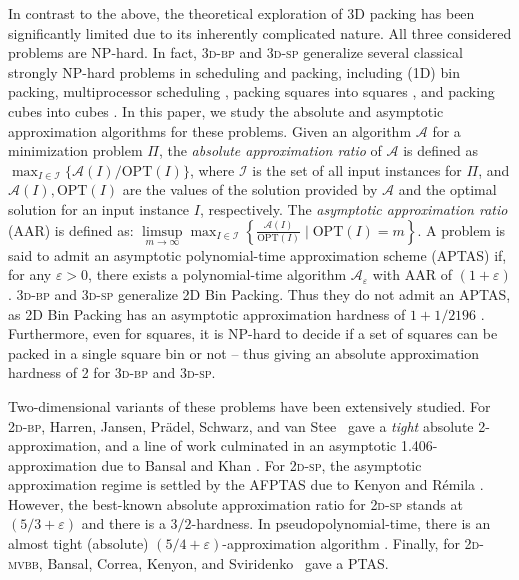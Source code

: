 \documentclass[a4paper,UKenglish,cleveref, autoref, thm-restate]{lipics-v2021}
\newcommand{\eps}{\varepsilon}
\newcommand{\opt}{\mathrm{OPT}}
\newcommand{\tbp}{\textsc{3d-bp}\xspace}
\newcommand{\tsp}{\textsc{3d-sp}\xspace}
\begin{document}
In contrast to the above, the theoretical exploration of 3D packing has been significantly limited due to its inherently complicated nature. 
All three considered problems are NP-hard. In fact, \tbp and \tsp generalize several classical strongly NP-hard problems in scheduling and packing, including (1D) bin packing, multiprocessor scheduling \cite{li-cheng}, packing squares into squares \cite{ferreira1999packing}, and packing cubes into cubes \cite{lu2015packing}. 
In this paper, we study the absolute and asymptotic approximation algorithms for these problems. Given an algorithm $\mathcal{A}$ for a minimization problem $\Pi$, the {\em absolute approximation ratio} of $\mathcal{A}$ is defined as $\max_{I \in \mathcal{I}} \{\mathcal{A}(I)/\opt(I)\}$, where 
$\mathcal{I}$ is the set of all input instances for $\Pi$, and $\mathcal{A}(I), \opt(I)$ are the values of the solution provided by  $\mathcal{A}$ and the optimal solution for an  input instance $I$, respectively.
The {\em asymptotic approximation ratio} (AAR) is defined as: 
$\limsup\limits_{m\rightarrow \infty} \max_{I \in \mathcal{I}} \left\{\frac{\mathcal{A}(I)}{\opt(I)} \mid \opt(I)=m \right\}.$
A problem is said to admit an asymptotic polynomial-time approximation scheme (APTAS) if, for any $\eps>0$, there exists a polynomial-time algorithm $\mathcal{A}_\eps$ with AAR of $(1+\eps)$.
\tbp and \tsp generalize 2D Bin Packing. Thus they do not admit an APTAS, as 2D Bin Packing has an asymptotic approximation hardness of $1+1/2196$ \cite{chlebik2009hardness}. 
Furthermore, even for squares, it is NP-hard to decide if a set of squares can be packed in a single square bin or not \cite{ferreira1999packing} -- thus giving an absolute approximation hardness of 2 for \tbp and \tsp.

Two-dimensional variants of these problems have been extensively studied. For \textsc{2d-bp}, Harren, Jansen, Pr{\"a}del, Schwarz, and van Stee~\cite{harren2013two} gave a {\em tight} absolute 2-approximation, and a line of work \cite{caprara2008packing,bansal2010new,jansen2016new} culminated in an asymptotic 1.406-approximation due to Bansal and Khan \cite{bansal2014improved}. 
For \textsc{2d-sp}, the asymptotic approximation regime is settled by the AFPTAS due to Kenyon and R{\'{e}}mila \cite{kenyon2000near}.
However, the best-known absolute approximation ratio for \textsc{2d-sp}  stands at $(5/3+\eps)$ \cite{harren20145} and there is a $3/2$-hardness. In pseudopolynomial-time, there is an almost tight (absolute) $(5/4+\eps)$-approximation algorithm \cite{JansenR19, HenningJRS18}. 
Finally, for \textsc{2d-mvbb}, Bansal, Correa, Kenyon, and Sviridenko~\cite{bansal2006bin} gave a PTAS.
\end{document}
